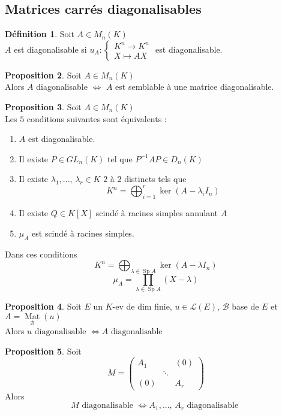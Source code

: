 \documentclass[10pt,a4paper]{article}
\theoremstyle{definition}
\newtheorem{proposition}{Proposition}[section]
\newtheorem{definition}[proposition]{Définition}
\DeclareMathOperator{\Sp}{Sp}
\DeclareMathOperator*{\Mat}{Mat}
\begin{document}
\subsection{Matrices carrés diagonalisables}
\begin{definition}
Soit $A \in M_n(K)$ \\
$A$ est diagonalisable si $u_A : \begin{cases}
K^n \to K^n \\
X \mapsto AX
\end{cases}$ est diagonalisable.
\end{definition}
\begin{proposition}
Soit $A \in M_n(K)$ \\
Alors $A$ diagonalisable $\iff$ $A$ est semblable à une matrice diagonalisable.
\end{proposition}
\begin{proposition}
Soit $A \in M_n(K)$ \\
Les $5$ conditions suivantes sont équivalents :
\begin{enumerate}
\item $A$ est diagonalisable.
\item Il existe $P \in GL_n(K)$ tel que $P^{-1}AP \in D_n(K)$
\item Il existe $\lambda_1, ...,\, \lambda_r \in K$ $2$ à $2$ distincts tels que
\[ K^n = \bigoplus_{i = 1}^r \ker \left( A - \lambda_i I_n \right) \]
\item Il existe $Q \in K[X]$ scindé à racines simples annulant $A$
\item $\mu_A$ est scindé à racines simples.
\end{enumerate}
Dans ces conditions
\[ \boxed{K^n = \bigoplus_{\lambda \in \Sp A} \ker \left( A - \lambda I_n \right)} \]
\[ \boxed{\mu_A = \prod_{\lambda \in \Sp A} (X - \lambda)} \]
\end{proposition}
\begin{proposition}
Soit $E$ un $K$-ev de dim finie, $u \in \mathcal{L}(E)$, $\mathcal{B}$ base de $E$ et $A = \Mat\limits_{\mathcal{B}}(u)$ \\
Alors $\boxed{u \text{ diagonalisable } \iff A \text{ diagonalisable }}$
\end{proposition}
\begin{proposition}
Soit 
\[ M = \begin{pmatrix}
\boxed{A_1} & & (0) \\
& \ddots &  \\
(0) & & \boxed{A_r}
\end{pmatrix} \]
Alors \[ \boxed{M \text{ diagonalisable } \iff A_1, ...,\, A_r \text{ diagonalisable }} \]
\end{proposition}
\end{document}

